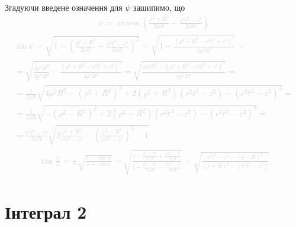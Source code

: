 Згадуючи введене означення для $ \psi $ зашипимо, що
%
\textcolor{lightgray}{ \begin{equation*} \begin{aligned}
\psi = \arccos \left( \frac{\rho^2 + R^2}{2 \rho R} - 
\frac{c^2 t^2 - z^2}{2 \rho R} \right)
\end{aligned} \end{equation*} }
%
\textcolor{lightgray}{ \begin{equation*} \begin{aligned}
\sin \psi = \sqrt{1 - \left( \frac{\rho^2 + R^2}{2 \rho R} - 
\frac{c^2 t^2 - z^2}{2 \rho R} \right)^2} = 
\sqrt{1 - \frac{\left( \rho^2 + R^2 - c^2 t^2 + z^2 \right)^2}{4 \rho^2 R^2} } = \\
= \sqrt{\frac{4 \rho^2 R^2}{4 \rho^2 R^2} - 
\frac{\left( \rho^2 + R^2 - c^2 t^2 + z^2 \right)^2}{4 \rho^2 R^2} } =
\sqrt{\frac{4 \rho^2 R^2 - \left( \rho^2 + R^2 - c^2 t^2 + z^2 \right)^2}
{4 \rho^2 R^2}} = \\
= \frac{1}{2 \rho R} \sqrt{4 \rho^2 R^2 - \left( \rho^2 + R^2 \right)^2 +
2 \left( \rho^2 + R^2 \right) \left( c^2 t^2 - z^2 \right) - 
\left( c^2 t^2 - z^2 \right)^2} = \\
= \frac{1}{2 \rho R} \sqrt{- \left( \rho^2 - R^2 \right)^2 +
2 \left( \rho^2 + R^2 \right) \left( c^2 t^2 - z^2 \right) - 
\left( c^2 t^2 - z^2 \right)^2} = \\
= \frac{c^2 t^2 - z^2}{2 \rho R} \sqrt{2 \frac{\rho^2 + R^2 }{c^2 t^2 - z^2} - 
\left( \frac{\rho^2 - R^2 }{c^2 t^2 - z^2} \right)^2 - 1}
\end{aligned} \end{equation*} }
%
\textcolor{lightgray}{ \begin{equation*} \begin{aligned}
\tan \frac{\psi}{2} = \pm \sqrt{ \frac{1 - \cos \psi}{1 + \cos \psi} } = 
\sqrt{ \frac{1- \frac{\rho^2 + R^2}{2 \rho R} + \frac{c^2 t^2 - z^2}{2 \rho R}}
{1 + \frac{\rho^2 + R^2}{2 \rho R} - \frac{c^2 t^2 - z^2}{2 \rho R}} } =
\sqrt{ \frac{c^2t^2 - z^2 - \left( \rho - R \right)^2}
{\left( \rho + R \right)^2 - \left( c^2t^2 - z^2 \right)} }
\end{aligned} \end{equation*} }

\section{Інтеграл 2}
